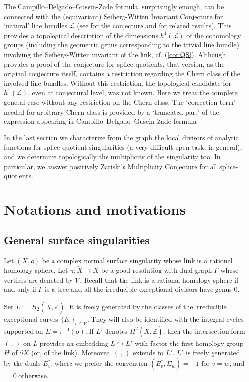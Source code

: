 \documentclass[10pt,a4paper]{amsart}
\numberwithin{equation}{section}
\numberwithin{equation}{subsection}
\theoremstyle{plain}
\theoremstyle{definition}
\providecommand{\coloneqq}{\mathrel{:=}}
\begin{document}
The Campillo--Delgado--Gusein-Zade formula, surprisingly enough,
can be connected with the (equivariant) Seiberg-Witten Invariant
Conjecture for `natural' line bundles ${\mathcal{L}}$ (see
\cite{nemethi02:_seiber_witten,Line} for the conjecture and
\cite{INV} for related results). This provides a topological
description of the dimensions $h^1({\mathcal{L}})$ of the cohomology
groups (including the geometric genus corresponding to the trivial
line bundle) involving the Seiberg-Witten invariant of the link,
cf. (\ref{cor:QS}). Although  \cite{BN} provides a proof 
of  the conjecture for splice-quotients, that version,
as the original conjecture itself, contains a restriction
regarding the Chern class of the involved line bundles. Without
this restriction, the topological candidate for
$h^1({\mathcal{L}})$, even at conjectural level, was not known. Here
we treat the complete general case without any restriction on the
Chern class. The `correction term' needed for arbitrary Chern
class is provided by a `truncated part' of the expression
appearing in Campillo--Delgado--Gusein-Zade formula.

In the last section we characterize from the graph the local
divisors of analytic functions for splice-quotient singularities
(a very difficult open task, in general), and we determine topologically
the multiplicity of the singularity too. In particular, we answer
positively Zariski's Multiplicity Conjecture for all
splice-quotients.

\section{Notations and motivations}
\label{sec:main-results}

\subsection{General surface singularities}\label{ss:11}

Let \((X,o)\) be a complex normal surface singularity whose link
is a rational homology sphere.  Let \(\pi:\widetilde{X}\to X\) be
a good resolution with dual graph  \(\Gamma\) whose vertices are
denoted by ${\mathcal{V}}$. Recall that the link is a rational homology
sphere if and only if \(\Gamma\) is a tree and all the irreducible
exceptional divisors have genus \(0\).

Set \(L \coloneqq H_2 ( \widetilde{X},{\mathbb{Z}} )\). It is freely
generated by the classes of the irreducible exceptional curves
\(\{E_v\}_{v\in{\mathcal{V}}}\). They will also be identified with the
integral cycles supported on $E=\pi^{-1}(o)$. If  \(L'\) denotes
\(H^2( \widetilde{X}, {\mathbb{Z}} )\), then the intersection form
\((\,,\,)\) on \(L\) provides an embedding \(L \hookrightarrow
L'\) with factor the first homology group \(H\) of \(\partial
\widetilde{X}\) (or, of the link). Moreover,  $(\,,\,)$ extends to
$L'$. $L'$ is freely generated by the duals \(E_v^*\), where we
prefer the convention $ ( E_v^*, E_w) =  -1 $ for $v = w$, and
$=0$ otherwise.
\end{document}

